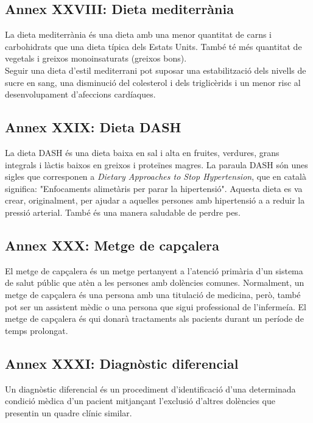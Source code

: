 \documentclass[a4paper,12pt]{article}
\begin{document}
\subsection*{Annex XXVIII: Dieta mediterrània}
La dieta mediterrània és una dieta amb una menor quantitat de carns i carbohidrats que una dieta típica dels Estats Units. També té més quantitat de vegetals i greixos monoinsaturats (greixos bons).\\
Seguir una dieta d'estil mediterrani pot suposar una estabilització dels nivells de sucre en sang, una disminució del colesterol i dels triglicèrids i un menor risc al desenvolupament d'afeccions cardíaques.
\subsection*{Annex XXIX: Dieta DASH}
La dieta DASH és una dieta baixa en sal i alta en fruites, verdures, grans integrals i làctis baixos en greixos i proteïnes magres. La paraula DASH són unes sigles que corresponen a \textit{Dietary Approaches to Stop Hypertension}, que en català significa: "Enfocaments alimetàris per parar la hipertensió". Aquesta dieta es va crear, originalment, per ajudar a aquelles persones amb hipertensió a a reduir la pressió arterial. També és una manera saludable de perdre pes.
\subsection*{Annex XXX: Metge de capçalera}
El metge de capçalera és un metge pertanyent a l'atenció primària d'un sistema de salut públic que atèn a les persones amb dolències comunes. Normalment, un metge de capçalera és una persona amb una titulació de medicina, però, també pot ser un assistent mèdic o una persona que sigui professional de l'infermeía. El metge de capçalera és qui donarà tractaments als pacients durant un període de temps prolongat.
\subsection*{Annex XXXI: Diagnòstic diferencial}
Un diagnòstic diferencial és un procediment d'identificació d'una determinada condició mèdica d'un pacient mitjançant l'exclusió d'altres dolències que presentin un quadre clínic similar.
\end{document}
